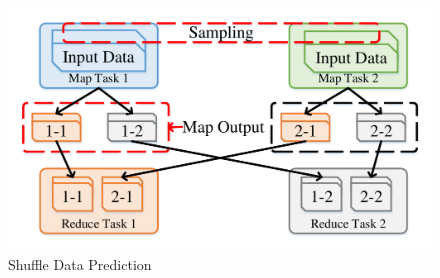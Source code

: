 \begin{figure}
	\centering
	\includegraphics[width=0.9\linewidth]{fig/shuffle}
	\caption{Shuffle Data Prediction}
	\label{fig:shuffle}
	\vspace{-1em}
\end{figure}
